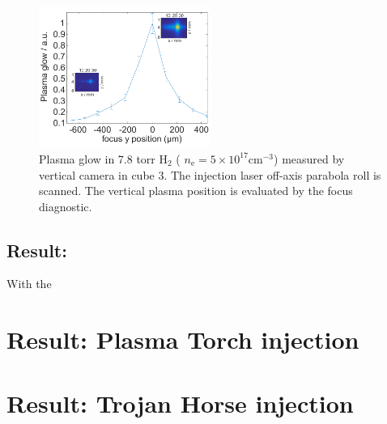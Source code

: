 \begin{figure}[htbp]
\includegraphics[width=0.5\textwidth]{experiment/images/edited/Plasma_Glow_roll.pdf}
\caption{Plasma glow in 7.8 torr $\mathrm{H}_2$ ( $n_\mathrm{e}=5\times10^{17}\mathrm{cm}^{-3} $) measured by vertical camera in cube 3. The injection laser off-axis parabola roll is scanned. The vertical plasma position is evaluated by the focus diagnostic.}
\label{img:PlasmaGlowRoll}
\end{figure}



\subsection*{Result:}
With the 
\section{Result: Plasma Torch injection}
\section{Result: Trojan Horse injection}
